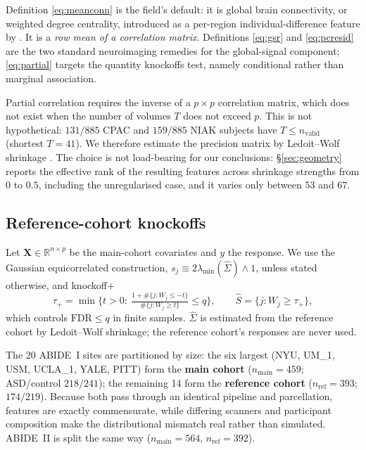 \documentclass[11pt,a4paper]{article}
\newcommand{\X}{\mathbf{X}}
\newcommand{\FDR}{\mathrm{FDR}}
\newcommand{\ld}{\lambda_{\min}}
\begin{document}
\noindent
Definition \eqref{eq:meanconn} is the field's default: it is global brain
connectivity, or weighted degree centrality, introduced as a per-region
individual-difference feature by \citet{cole2012global}. It is a \emph{row
mean of a correlation matrix}. Definitions \eqref{eq:gsr} and
\eqref{eq:pcresid} are the two standard neuroimaging remedies for the
global-signal component; \eqref{eq:partial} targets the quantity knockoffs
test, namely conditional rather than marginal association.

Partial correlation requires the inverse of a $p\times p$ correlation
matrix, which does not exist when the number of volumes $T$ does not exceed
$p$. This is not hypothetical: $131/885$ CPAC and $159/885$ NIAK subjects
have $T\le n_{\mathrm{valid}}$ (shortest $T=41$). We therefore estimate the
precision matrix by Ledoit--Wolf shrinkage \citep{ledoit2004honey}. The
choice is not load-bearing for our conclusions: \S\ref{sec:geometry}
reports the effective rank of the resulting features across shrinkage
strengths from $0$ to $0.5$, including the unregularised case, and it varies
only between $53$ and $67$.

\subsection{Reference-cohort knockoffs}
\label{sec:rc}

Let $\X\in\mathbb{R}^{n\times p}$ be the main-cohort covariates and $y$ the
response. We use the Gaussian equicorrelated construction, $s_j\equiv
2\ld(\hat\Sigma)\wedge1$, unless stated otherwise, and knockoff$+$
\begin{equation}
  \tau_+=\min\Big\{t>0:\ \tfrac{1+\#\{j:W_j\le -t\}}{\#\{j:W_j\ge t\}}\le q\Big\},
  \qquad \hat S=\{j:W_j\ge\tau_+\},
  \label{eq:tau}
\end{equation}
which controls $\FDR\le q$ in finite samples. $\hat\Sigma$ is estimated from
the reference cohort by Ledoit--Wolf shrinkage; the reference cohort's
responses are never used.

The 20 ABIDE~I sites are partitioned by size: the six largest (NYU, UM\_1,
USM, UCLA\_1, YALE, PITT) form the \textbf{main cohort} ($n_{\mathrm{main}}
=459$; ASD/control $218/241$); the remaining 14 form the \textbf{reference
cohort} ($n_{\mathrm{ref}}=393$; $174/219$). Because both pass through an
identical pipeline and parcellation, features are exactly commensurate,
while differing scanners and participant composition make the
distributional mismatch real rather than simulated. ABIDE~II is split the
same way ($n_{\mathrm{main}}=564$, $n_{\mathrm{ref}}=392$).
\end{document}
